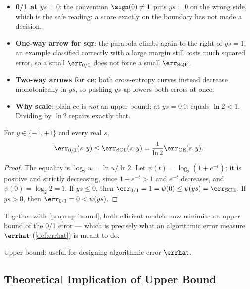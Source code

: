\begin{itemize}
    \item \textbf{0/1 at \(ys = 0\)}: the convention \(\sign(0) \neq 1\) puts \(ys
        = 0\) on the wrong side, which is the safe reading: a score exactly on
        the boundary has not made a decision.
    \item \textbf{One-way arrow for sqr}: the parabola climbs again to the right
        of \(ys = 1\): an example classified correctly with a large margin still
        costs much squared error, so a small \(\err_{0/1}\) does not force a
        small \(\err_{\mathrm{SQR}}\).
    \item \textbf{Two-way arrows for ce}: both cross-entropy curves instead
        decrease monotonically in \(ys\), so pushing \(ys\) up lowers both
        errors at once.
    \item \textbf{Why scale}: plain ce is \emph{not} an upper bound: at \(ys = 0\)
        it equals \(\ln 2 < 1\). Dividing by \(\ln 2\) repairs exactly that.
\end{itemize}

\begin{proposition}
    \label{prop:sce-bound}
    For \(y \in \{-1, +1\}\) and every real \(s\),
    \[
        \err_{0/1}(s, y) \le \err_{\mathrm{SCE}}(s, y) = \frac{1}{\ln 2}
        \err_{\mathrm{CE}}(s, y) .
    \]
\end{proposition}

\begin{proof}
    The equality is \(\log_2 u = \ln u / \ln 2\). Let \(\psi(t) = \log_2(1 +
    e^{-t})\); it is positive and strictly decreasing, since \(1 + e^{-t} > 1\)
    and \(e^{-t}\) decreases, and \(\psi(0) = \log_2 2 = 1\). If \(ys \le 0\),
    then \(\err_{0/1} = 1 = \psi(0) \le \psi(ys) = \err_{\mathrm{SCE}}\). If
    \(ys > 0\), then \(\err_{0/1} = 0 < \psi(ys)\).
\end{proof}

Together with \autoref{prop:sqr-bound}, both efficient models now minimise an
upper bound of the 0/1 error --- which is precisely what an algorithmic error
measure \(\errhat\) (\autoref{def:errhat}) is meant to do.

\begin{moral}
    \textcolor{orange!85!black}{Upper bound}: useful for designing algorithmic
    error \(\errhat\).
\end{moral}

\subsection{Theoretical Implication of Upper Bound}

